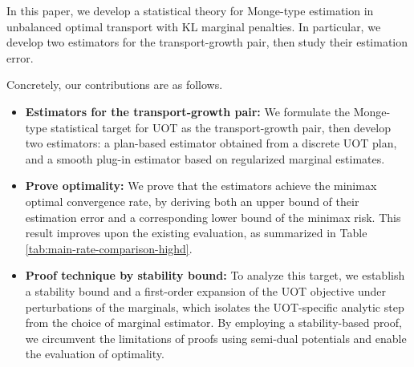 \documentclass[11pt,reqno]{amsart}
\theoremstyle{definition}
\begin{document}
In this paper, we develop a statistical theory for Monge-type estimation in unbalanced optimal transport with KL marginal penalties. In particular, we develop two estimators for the transport-growth pair, then study their estimation error. 

Concretely, our contributions are as follows.
\begin{itemize}
    \item \textbf{Estimators for the transport-growth pair: }We formulate the Monge-type statistical target for UOT as the transport-growth pair, then develop two estimators: a plan-based estimator obtained from a discrete UOT plan, and a smooth plug-in estimator based on regularized marginal estimates. 
    \item \textbf{Prove optimality: } We prove that the estimators achieve the minimax optimal convergence rate, by deriving both an upper bound of their estimation error and a corresponding lower bound of the minimax risk. This result improves upon the existing evaluation, as summarized in Table \ref{tab:main-rate-comparison-highd}.
    \item \textbf{Proof technique by stability bound:} To analyze this target, we establish a stability bound and a first-order expansion of the UOT objective under perturbations of the marginals, which isolates the UOT-specific analytic step from the choice of marginal estimator.
    By employing a stability-based proof, we circumvent the limitations of proofs using semi-dual potentials and enable the evaluation of optimality.
\end{itemize}
\end{document}
